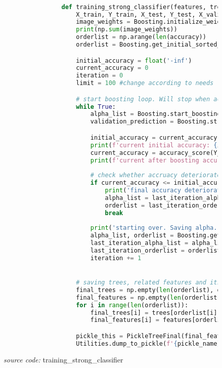 		\begin{figure}[H]
			\begin{lstlisting}[language=Python, basicstyle=\tiny]

				def training_strong_classifier(features, trees, splits, accuracy, pickle_name):
					X_train, Y_train, X_test, Y_test, X_valid, Y_valid = splits
					image_weights = Boosting.initialize_weight(Y_test)
					print(np.sum(image_weights))
					orderlist = np.arange(len(accuracy))
					orderlist = Boosting.get_initial_sorted_accuracy(accuracy, orderlist)

					initial_accuracy = float('-inf')
					current_accuracy = 0
					iteration = 0
					limit = 100 #change according to needs

					# start boosting loop. Will stop when accuracy fell or iteration hit limit
					while True:
						alpha_list = Boosting.start_boosting(trees, X_test, Y_test, image_weights, orderlist)
						validation_prediction = Boosting.strong_prediction(trees, orderlist, X_valid, alpha_list)

						initial_accuracy = current_accuracy
						print(f'current initial accuracy: {initial_accuracy}')
						current_accuracy = accuracy_score(Y_valid, validation_prediction)
						print(f'current after boosting accuracy: {current_accuracy}')
						
						# check whether accruacy deteriorate or limit hit
						if current_accuracy <= initial_accuracy or iteration >= limit:
							print('final accuracy deteriorate, rolling back to last iteration...')
							alpha_list = last_iteration_alpha_list
							orderlist = last_iteration_orderlist
							break
						
						print('starting over. Saving alpha...')
						alpha_list, orderlist = Boosting.get_sorted_accuracy(alpha_list, orderlist)
						last_iteration_alpha_list = alpha_list
						last_iteration_orderlist = orderlist
						iteration += 1


					# saving trees, related features and its order in pickle
					final_trees = np.empty(len(orderlist), dtype=object)
					final_features = np.empty(len(orderlist), dtype=object)
					for i in range(len(orderlist)):
						final_trees[i] = trees[orderlist[i]]
						final_features[i] = features[orderlist[i]]

					pickle_this = PickleTreeFinal(final_features, final_trees, alpha_list)
					Utilities.dump_to_pickle(f'{pickle_name}', pickle_this)
			\end{lstlisting}
			\caption{\emph{source code:} training\_strong\_classifier}
			\label{code: training strong classifier}
		\end{figure}

